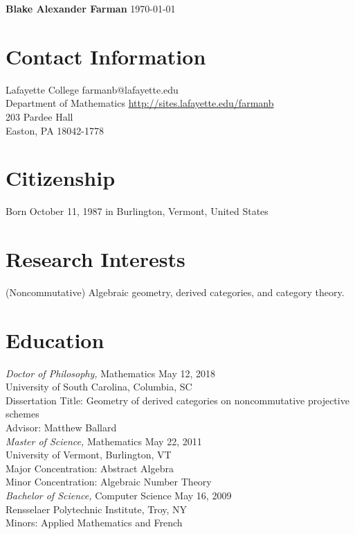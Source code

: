 \documentclass{article}
\begin{document}
\noindent\textbf{\large{Blake Alexander Farman}} \hfill \today\\
\noindent\makebox[\linewidth]{\rule{\textwidth}{0.4pt}}

\section*{Contact Information}
  Lafayette College \hfill farmanb@lafayette.edu\\
  Department of Mathematics \hfill \hyperref[http://sites.lafayette.edu/farmanb]{http://sites.lafayette.edu/farmanb}\\
  203 Pardee Hall \\%
  Easton, PA 18042-1778

  \section*{Citizenship}
  Born October 11, 1987 in Burlington, Vermont, United States

  \section*{Research Interests}
  (Noncommutative) Algebraic geometry, derived categories, and category theory.

  \section*{Education} 
  \textsl{Doctor of Philosophy,} Mathematics \hfill  May 12, 2018\\
  University of South Carolina, Columbia, SC\\
  Dissertation Title: Geometry of derived categories on noncommutative projective schemes\\
  Advisor: Matthew Ballard\\
  
  \noindent
  \textsl{Master of Science,} Mathematics \hfill May 22, 2011\\
  University of Vermont, Burlington, VT\\
  Major Concentration: Abstract Algebra\\
  Minor Concentration: Algebraic Number Theory\\
  
  \noindent\textsl{Bachelor of Science,} Computer Science \hfill May 16, 2009\\
  Rensselaer Polytechnic Institute, Troy, NY\\
  Minors: Applied Mathematics and French
  
\end{document}
